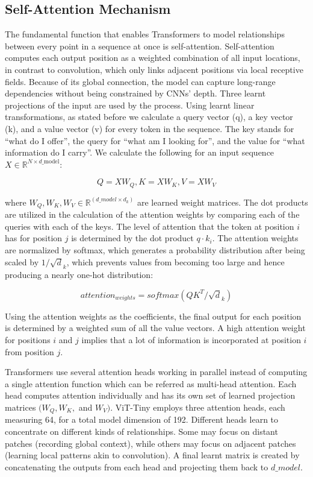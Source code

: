 \documentclass[english, LaM, oneside]{sapthesis}%
\numberwithin{equation}{chapter}
\begin{document}
\subsection{Self-Attention Mechanism}
The fundamental function that enables Transformers to model relationships between every point in a sequence at once is self-attention. Self-attention computes each output position as a weighted combination of all input locations, in contrast to convolution, which only links adjacent positions via local receptive fields. Because of its global connection, the model can capture long-range dependencies without being constrained by CNNs' depth.
Three learnt projections of the input are used by the process. Using learnt linear transformations, as stated before we calculate a query vector (q), a key vector (k), and a value vector (v) for every token in the sequence. The key stands for \enquote{what do I offer}, the query for \enquote{what am I looking for}, and the value for \enquote{what information do I carry}. We calculate the following for an input sequence $X \in \mathbb{R}^{N \times d\_{\text{model}}}$:

\begin{equation}
    Q = XW_Q,  K = XW_K,  V = XW_V
\end{equation}

where $W_Q, W_K, W_V \in \mathbb{R}^{(d\_model\times d_k)}$ are learned weight matrices.
The dot products are utilized in the calculation of the attention weights by comparing each of the queries with each of the keys. The level of attention that the token at position $i$ has for position $j$ is determined by the dot product $q \cdot k_i$. The attention weights are normalized by softmax, which generates a probability distribution after being scaled by $1/\sqrt d_k$, which prevents values from becoming too large and hence producing a nearly one-hot distribution:

\begin{equation}
    attention_{weights} = softmax(QK^T / \sqrt d_k)
\end{equation}

Using the attention weights as the coefficients, the final output for each position is determined by a weighted sum of all the value vectors. A high attention weight for positions $i$ and $j$ implies that a lot of information is incorporated at position $i$ from position $j$.

Transformers use several attention heads working in parallel instead of computing a single attention function which can be referred as multi-head attention\cite{26}. Each head computes attention individually and has its own set of learned projection matrices $(W_Q, W_K,$ and $W_V)$. ViT-Tiny employs three attention heads, each measuring 64, for a total model dimension of 192. Different heads learn to concentrate on different kinds of relationships. Some may focus on distant patches (recording global context), while others may focus on adjacent patches (learning local patterns akin to convolution). A final learnt matrix is created by concatenating the outputs from each head and projecting them back to $d\_model$.
\end{document}

